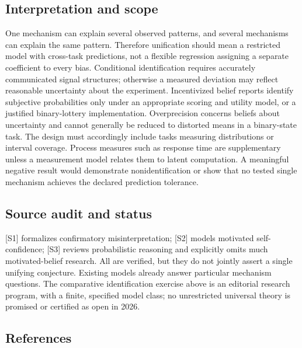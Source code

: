 \documentclass[11pt,a4paper]{article}
\begin{document}
\subsection*{Interpretation and scope}

One mechanism can explain several observed patterns, and several mechanisms can explain the same pattern. Therefore unification should mean a restricted model with cross-task predictions, not a flexible regression assigning a separate coefficient to every bias. Conditional identification requires accurately communicated signal structures; otherwise a measured deviation may reflect reasonable uncertainty about the experiment. Incentivized belief reports identify subjective probabilities only under an appropriate scoring and utility model, or a justified binary-lottery implementation. Overprecision concerns beliefs about uncertainty and cannot generally be reduced to distorted means in a binary-state task. The design must accordingly include tasks measuring distributions or interval coverage. Process measures such as response time are supplementary unless a measurement model relates them to latent computation. A meaningful negative result would demonstrate nonidentification or show that no tested single mechanism achieves the declared prediction tolerance.

\subsection*{Source audit and status}

[S1] formalizes confirmatory misinterpretation; [S2] models motivated self-confidence; [S3] reviews probabilistic reasoning and explicitly omits much motivated-belief research. All are verified, but they do not jointly assert a single unifying conjecture. Existing models already answer particular mechanism questions. The comparative identification exercise above is an editorial research program, with a finite, specified model class; no unrestricted universal theory is promised or certified as open in 2026.

\subsection*{References}
\end{document}
